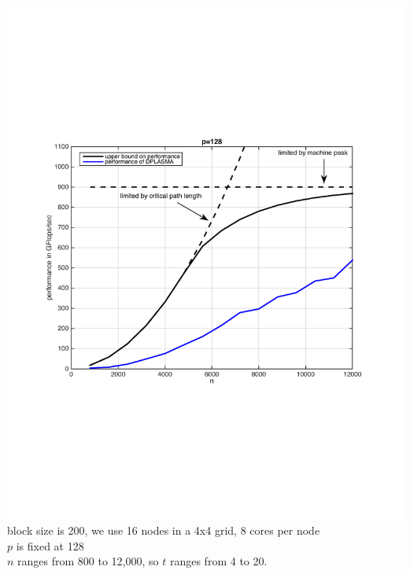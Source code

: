 \begin{frame}

\includegraphics[width=.80\textwidth]{dague_faverge/data3.pdf}\\
block size is 200, we use 16 nodes in a 4x4 grid, 8 cores per node\\
$p$ is fixed at 128\\
$n$ ranges from 800 to 12,000, so $t$ ranges from 4 to 20.


\end{frame}


\section{}

 \begin{frame}
   \tableofcontents
 \end{frame}


\begin{frame}

\footnotesize
\nocite{konig1988}
\nocite{COSNARD1988275}
\nocite{j38}
\nocite{Robert1989159}
\nocite{Kurzak2008}





  



\end{frame}






